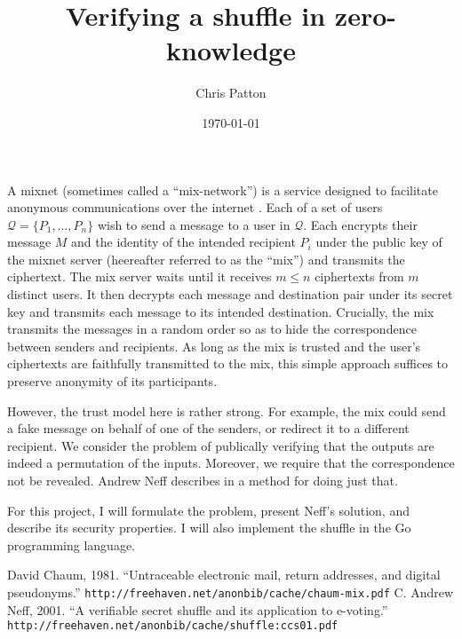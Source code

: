 \documentclass[letter]{article}
\date{\today}
\title{Verifying a shuffle in zero-knowledge}
\author{Chris Patton}
\renewcommand{\cal}[1]{\mathcal{#1}}
\begin{document}
  \maketitle

A mixnet (sometimes called a ``mix-network'') is a service designed to facilitate anonymous
communications over the internet \cite{chaum81}. Each of a set of users $\cal{Q} = \{P_1, \dots, P_n\}$
wish to send a message to a user in $\cal{Q}$. Each encrypts their message $M$ and
the identity of the intended recipient $P_i$ under the public key of the mixnet server
(heereafter referred to as the ``mix'') and transmits the ciphertext.
The mix server waits until it receives $m \le n$ ciphertexts from $m$ distinct users.
It then decrypts each message and destination pair under its secret key and transmits
each message to its intended destination. Crucially, the mix transmits the messages in a
random order so as to hide the correspondence between senders and recipients.
As long as the mix is trusted and the user's ciphertexts are faithfully
transmitted to the mix, this simple approach suffices to preserve anonymity of its
participants.

However, the trust model here is rather strong. For example, the mix could send a
fake message on behalf of one of the senders, or redirect it to a different recipient.
We consider the problem of publically verifying that the outputs are indeed a permutation
of the inputs. Moreover, we require that the correspondence not be revealed. Andrew Neff
describes in \cite{neff01} a method for doing just that.

For this project, I will formulate the problem, present Neff's solution, and describe
its security properties. I will also implement the shuffle in the Go programming language.




\begin{thebibliography}{99}

   David Chaum, 1981. ``Untraceable electronic mail, return addresses, and digital pseudonyms.''
    {\tt http://freehaven.net/anonbib/cache/chaum-mix.pdf}
   C. Andrew Neff, 2001. ``A verifiable secret shuffle and its application to e-voting.'' {\tt http://freehaven.net/anonbib/cache/shuffle:ccs01.pdf}

\end{thebibliography}
\end{document}
